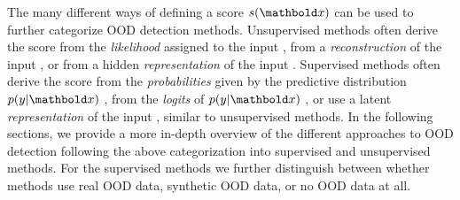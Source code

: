 The many different ways of defining a score $s(\xb)$ can be used to further categorize OOD detection methods.
Unsupervised methods often derive the score 
from the \emph{likelihood} assigned to the input \parencite{bishop_novelty_1994,choi_waic_2019,kirichenko_why_2020,ren_likelihood_2019,serra_input_2020,xiao_likelihood_2020,morningstar_density_2021,nalisnick_detecting_2019,bergamin_modelagnostic_2022,maaloe_biva_2019,havtorn_hierarchical_2021}, 
from a \emph{reconstruction} of the input \parencite{sakurada_anomaly_2014,xia_learning_2015,lyudchik_outlier_2016,zhou_anomaly_2017,chen_outlier_2017,schlegl_unsupervised_2017,zong_deep_2018,li_madgan_2019,graham_denoising_2023,liu_unsupervised_2023a}, or 
from a hidden \emph{representation} of the input \parencite{denouden_improving_2018,hendrycks_using_2019,ahmadian_likelihoodfree_2021,bergman_classificationbased_2020,tack_csi_2020,sehwag_ssd_2021,xiao_we_2021}.  %
Supervised methods often derive the score 
from the \emph{probabilities} given by the predictive distribution $p(y|\xb)$ \parencite{hendrycks_baseline_2017,hendrycks_scaling_2022}, 
from the \emph{logits} of $p(y|\xb)$ \parencite{hendrycks_scaling_2022,liu_energy-based_2020}, or 
use a latent \emph{representation} of the input \parencite{lee_simple_2018,li_anomaly_2019,ndiour_outofdistribution_2020,cook_outlier_2020,zaeemzadeh_outofdistribution_2021}, similar to unsupervised methods. 
In the following sections, we provide a more in-depth overview of the different approaches to OOD detection following the above categorization into supervised and unsupervised methods. For the supervised methods we further distinguish between whether methods use real OOD data, synthetic OOD data, or no OOD data at all. 

